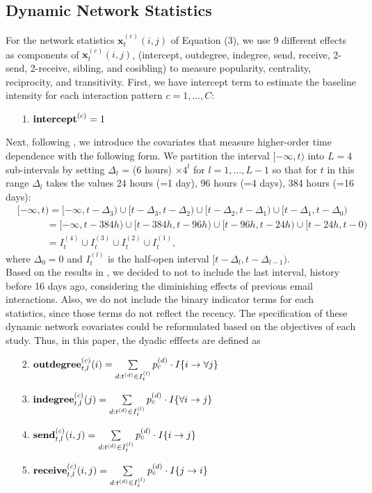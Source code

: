 \documentclass[a4paper]{article}
\begin{document}
 \subsection{Dynamic Network Statistics} \label{subsec: Dynamic covariates2}
 For the network statistics $\boldsymbol{x}^{(c)}_t(i, j)$ of Equation (3), we use 9 different effects as components of $\boldsymbol{x}^{(c)}_t(i, j)$, (intercept, outdegree, indegree, send, receive, 2-send, 2-receive, sibling, and cosibling) to measure popularity, centrality, reciprocity, and transitivity. First, we have intercept term to estimate the baseline intensity for each interaction pattern $c=1,...,C$:
 \begin{itemize}
	\item [1.] $\mbox{\textbf{intercept}}^{(c)}= 1$
 \end{itemize}
Next, following \cite{PerryWolfe2012}, we introduce the covariates that measure higher-order time dependence with the following
form. We partition the interval $[-\infty, t)$ into $L=4$ sub-intervals by setting $\Delta_l$ = (6 hours) $\times  4^l$ for $l=1,...,L-1$ so that for $t$ in this range $\Delta_l$ takes the values 24 hours (=1 day), 96 hours (=4 days), 384 hours (=16 days): 
\begin{equation*}
\begin{aligned}
&[-\infty,t) =[-\infty,t-\Delta_3)\cup [t-\Delta_3, t-\Delta_{2}) \cup [t-\Delta_{2}, t-\Delta_{1})\cup [t-\Delta_1, t-\Delta_{0})\\& \quad\quad\quad= [-\infty,t-384h)\cup [t-384h, t-96h) \cup [t-96h, t-24h)\cup [t-24h, t-0)
\\& \quad\quad\quad=I_t^{(4)}\cup  I_t^{(3)}\cup  I_t^{(2)}\cup I_t^{(1)},
\end{aligned}
\end{equation*}
where $\Delta_0 = 0$ and $I_{t}^{(l)} $ is the half-open interval $[t-\Delta_l, t-\Delta_{l-1})$. \\ \newline Based on the results in \cite{PerryWolfe2012}, we decided to not to include the last interval, history before 16 days ago, considering the diminishing effects of previous email interactions. Also, we do not include the binary indicator terms for each statistics, since those terms do not reflect the recency. The specification of these dynamic network covariates could be reformulated based on the objectives of each study. Thus, in this paper, the dyadic efffects are defined as
 \begin{itemize}
 	 	 \item [2.]  $\mbox{\textbf{outdegree}}^{(c)}_{t, l}(i)=\sum\limits_{d: t^{(d)} \in I_{t}^{(l)}}p_c^{(d)}\cdot I\{i\rightarrow \forall j\}$
 	 	 \item [3.] $\mbox{\textbf{indegree}}^{(c)}_{t, l}(j)=\sum\limits_{d: t^{(d)} \in I_{t}^{(l)}}p_c^{(d)}\cdot I\{\forall i \rightarrow j\}$	 	 	
 	 	 \item [4.]  $\mbox{\textbf{send}}^{(c)}_{t, l}(i, j)=\sum\limits_{d: t^{(d)} \in I_{t}^{(l)}}p_c^{(d)}\cdot I\{i\rightarrow j\}$
 	\item [5.] $\mbox{\textbf{receive}}^{(c)}_{t, l}(i, j)=\sum\limits_{d: t^{(d)} \in I_{t}^{(l)}}p_c^{(d)}\cdot I\{j\rightarrow i\}$
 \end{itemize}
\end{document}
